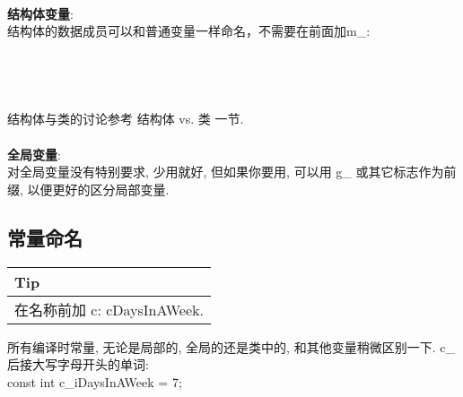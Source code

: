 \documentclass[a4paper,11pt,CJK]{article}
\begin{document}
\begin{CJK}{UTF8}{gbsn}
{\begin{minipage}{400pt}
\end{minipage}
}
\\
\\
\\
\noindent
\textbf{结构体变量}:\\
\indent 结构体的数据成员可以和普通变量一样命名，不需要在前面加m\_:\\
\\
\\
\\
\\
结构体与类的讨论参考 结构体 vs. 类 一节.\\
\\
\textbf{全局变量}:\\
对全局变量没有特别要求, 少用就好, 但如果你要用, 可以用 g\_ 或其它标志作为前缀, 以便更好的区分局部变量.\\

\subsection{常量命名}
\begin{table}[htbp]
\flushleft
\begin{tabular}{p{400pt}}
\toprule
\rowcolor[gray]{.8} Tip \\
\midrule
在名称前加 c: cDaysInAWeek.
\\
\bottomrule
\end{tabular}
\end{table}
所有编译时常量, 无论是局部的, 全局的还是类中的, 和其他变量稍微区别一下. c\_后接大写字母开头的单词:\\
const int c\_iDaysInAWeek = 7;


\end{CJK}
\end{document}
